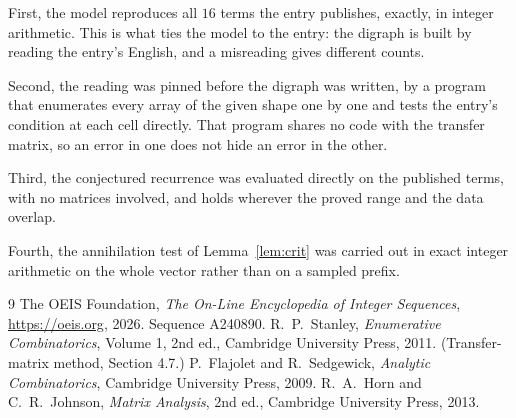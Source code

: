 \documentclass[11pt,a4paper]{article}
\theoremstyle{plain}
\theoremstyle{definition}
\begin{document}
First, the model reproduces all $16$ terms the entry publishes, exactly, in integer
arithmetic. This is what ties the model to the entry: the digraph is built by reading the
entry's English, and a misreading gives different counts.

Second, the reading was pinned before the digraph was written, by a program that enumerates
every array of the given shape one by one and tests the entry's condition at each cell
directly. That program shares no code with the transfer matrix, so an error in one does not
hide an error in the other.

Third, the conjectured recurrence was evaluated directly on the published terms, with no
matrices involved, and holds wherever the proved range and the data overlap.

Fourth, the annihilation test of Lemma~\ref{lem:crit} was carried out in exact integer
arithmetic on the whole vector rather than on a sampled prefix.

\begin{thebibliography}{9}
 The OEIS Foundation, \emph{The On-Line Encyclopedia of Integer
Sequences}, \url{https://oeis.org}, 2026. Sequence A240890.
 R.~P.~Stanley, \emph{Enumerative Combinatorics}, Volume 1, 2nd ed.,
Cambridge University Press, 2011. (Transfer-matrix method, Section 4.7.)
 P.~Flajolet and R.~Sedgewick, \emph{Analytic Combinatorics}, Cambridge
University Press, 2009.
 R.~A.~Horn and C.~R.~Johnson, \emph{Matrix Analysis}, 2nd ed., Cambridge
University Press, 2013.
\end{thebibliography}
\end{document}
